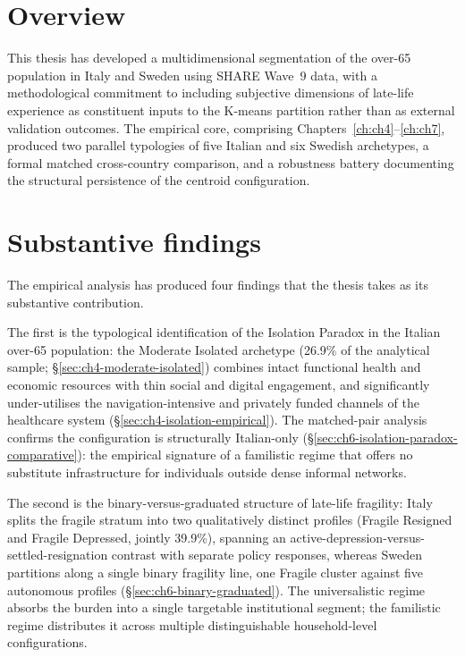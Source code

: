 \label{ch:ch9}

\section{Overview}
\label{sec:ch9-overview}

This thesis has developed a multidimensional segmentation of the over-65 population in Italy and Sweden using SHARE Wave~9 data, with a methodological commitment to including subjective dimensions of late-life experience as constituent inputs to the K-means partition rather than as external validation outcomes. The empirical core, comprising Chapters~\ref{ch:ch4}--\ref{ch:ch7}, produced two parallel typologies of five Italian and six Swedish archetypes, a formal matched cross-country comparison, and a robustness battery documenting the structural persistence of the centroid configuration.

\section{Substantive findings}
\label{sec:ch9-findings}

The empirical analysis has produced four findings that the thesis takes as its substantive \mbox{contribution}.

The first is the typological identification of the Isolation Paradox in the Italian over-65 population: the Moderate Isolated archetype (26.9\% of the analytical sample; \S\ref{sec:ch4-moderate-isolated}) combines intact functional health and economic resources with thin social and digital engagement, and significantly under-utilises the navigation-intensive and privately funded channels of the healthcare system (\S\ref{sec:ch4-isolation-empirical}). The matched-pair analysis confirms the configuration is structurally Italian-only (\S\ref{sec:ch6-isolation-paradox-comparative}): the empirical signature of a familistic regime that offers no substitute infrastructure for individuals outside dense informal networks.

The second is the binary-versus-graduated structure of late-life fragility: Italy splits the fragile stratum into two qualitatively distinct profiles (Fragile Resigned and Fragile Depressed, jointly 39.9\%), spanning an active-depression-versus-settled-resignation contrast with separate policy responses, whereas Sweden partitions along a single binary fragility line, one Fragile cluster against five autonomous profiles (\S\ref{sec:ch6-binary-graduated}). The universalistic regime absorbs the burden into a single targetable institutional segment; the familistic regime distributes it across multiple distinguishable household-level configurations.


